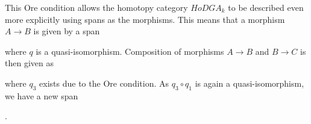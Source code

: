This Ore condition allows the homotopy category $HoDGA_k$ to be described even more explicitly using spans as the morphisms. This means that a morphism $A\longrightarrow B$ is given by a span
\begin{center}
\end{center}
where $q$ is a quasi-isomorphism. Composition of morphisms $A\longrightarrow B$ and $B\longrightarrow C$ is then given as
\begin{center}
\end{center}
where $q_3$ exists due to the Ore condition. As $q_3\circ q_1$ is again a quasi-isomorphism, we have a new span
\begin{center}
.
\end{center}



